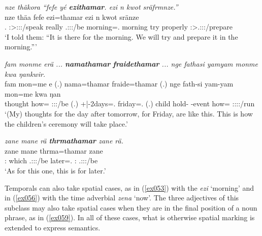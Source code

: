 \largerpage
\begin{exe}
	\ex \emph{nze thäkora ``fefe yé \textbf{ezithamar}. ezi n kwot sräfrmnze.''}\\
	\gll nze thäa fefe  ezi=thamar ezi n kwot sränze\\
	\Fsg.{\Erg} \Fsg:\Sbj>\Stpl:\Obj:\Pst:\Pfv/speak really \Tsg.\Masc:\Sbj:\Nonpast:\Ipfv/be morning=\Temp.{\Purp} morning try properly \Fpl:\Sbj>\Tsg.\Masc:\Obj:\Irr:\Ipfv/prepare\\
	\trans `I told them: ``It is there for the morning. We will try and prepare it in the morning.''' 
	\label{ex057}
\end{exe}
\begin{exe}
	\ex \emph{fam monme erä ... \textbf{namathamar} \textbf{fraidethamar} ... nge fathasi yamyam monme kwa ŋankwir.}\\
	\gll fam mon=me e (.) nama=thamar fraide=thamar (.) nge fath-si yam-yam mon=me kwa ŋan\\
	thought how={\Ins} \Stpl:\Sbj:\Nonpast:\Ipfv/be (.) +|-2days=\Temp.{\Purp} friday=\Temp.{\Purp} (.) child hold-{\Nmlz} \Redup-event how={\Ins} {\Fut} \Stsg:\Sbj:\Nonpast:\Ipfv:\Venit/run\\
	\trans `(My) thoughts for the day after tomorrow, for Friday, are like this. This is how the children's ceremony will take place.' 
	\label{ex055}
\end{exe}
\begin{exe}
	\ex \emph{zane mane rä \textbf{thrmathamar} zane rä.}\\
	\gll zane mane  thrma=thamar zane \\
	\Dem:{\Prox} which \Tsg.\F:\Sbj:\Nonpast:\Ipfv/be later=\Temp.{\Purp} \Dem:{\Prox} \Tsg.\F:\Sbj:\Nonpast:\Ipfv/be\\
	\trans `As for this one, this is for later.' 
	\label{ex058}
\end{exe}

Temporals can also take spatial cases, as in (\ref{ex053}) with the   \emph{ezi} `morning' and in (\ref{ex056}) with the time adverbial \emph{zena} `now'. The three adjectives of this subclass may also take spatial cases when they are in the final position of a noun phrase, as in (\ref{ex059}). In all of these cases, what is otherwise spatial marking is extended to express  semantics.


